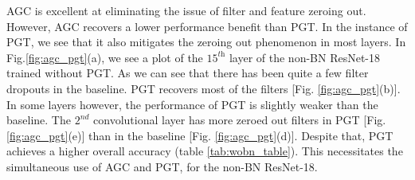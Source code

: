 \documentclass[times,sort&compress]{elsarticle}
\begin{document}
AGC is excellent at eliminating the issue of filter and feature zeroing out. However,
AGC recovers a lower performance benefit than PGT. In the instance of PGT, we see that
it also mitigates the zeroing out phenomenon in most layers. In
Fig.\ref{fig:agc_pgt}(a), we see a plot of the $15^\textit{th}$ layer of the non-BN
ResNet-18 trained without PGT. As we can see that there has been quite a few filter
dropouts in the baseline. PGT recovers most of the filters [Fig. \ref{fig:agc_pgt}(b)].
In some layers however, the performance of PGT is slightly weaker than the baseline. The
$2^\textit{nd}$ convolutional layer has more zeroed out filters in PGT [Fig.
\ref{fig:agc_pgt}(e)] than in the baseline [Fig. \ref{fig:agc_pgt}(d)]. Despite that,
PGT achieves a higher overall accuracy (table \ref{tab:wobn_table}). This necessitates
the simultaneous use of AGC and PGT, for the non-BN ResNet-18.
\end{document}
